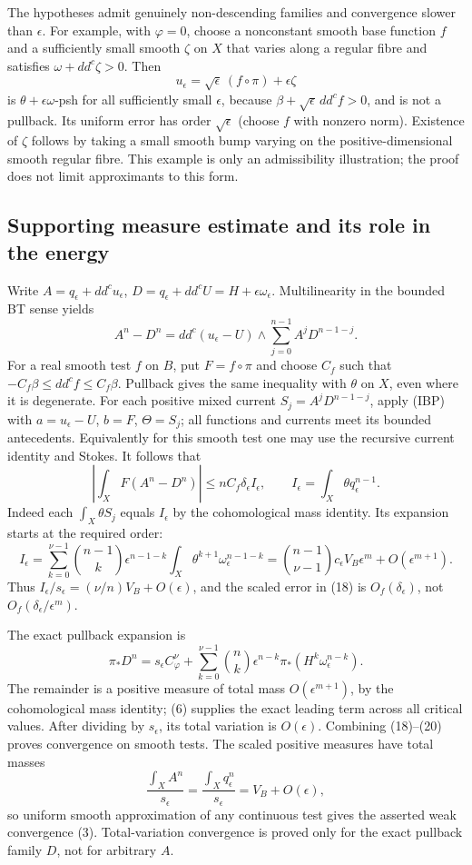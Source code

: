 \documentclass[
  11pt,
]{article}
\begin{document}
The hypotheses admit genuinely non-descending families and convergence
slower than \(\epsilon\). For example, with \(\varphi=0\), choose a
nonconstant smooth base function \(f\) and a sufficiently small smooth
\(\zeta\) on \(X\) that varies along a regular fibre and satisfies
\(\omega+dd^c\zeta>0\). Then
\[u_\epsilon=\sqrt\epsilon\,(f\circ\pi)+\epsilon\zeta\] is
\(\theta+\epsilon\omega\)-psh for all sufficiently small \(\epsilon\),
because \(\beta+\sqrt\epsilon\,dd^cf>0\), and is not a pullback. Its
uniform error has order \(\sqrt\epsilon\) (choose \(f\) with nonzero
norm). Existence of \(\zeta\) follows by taking a small smooth bump
varying on the positive-dimensional smooth regular fibre. This example
is only an admissibility illustration; the proof does not limit
approximants to this form.

\subsection{Supporting measure estimate and its role in the
energy}\label{supporting-measure-estimate-and-its-role-in-the-energy}

Write \(A=q_\epsilon+dd^cu_\epsilon\),
\(D=q_\epsilon+dd^cU=H+\epsilon\omega_\epsilon\). Multilinearity in the
bounded BT sense yields \[A^n-D^n=dd^c(u_\epsilon-U)\wedge
\sum_{j=0}^{n-1}A^jD^{n-1-j}. \tag{17}\] For a real smooth test \(f\) on
\(B\), put \(F=f\circ\pi\) and choose \(C_f\) such that
\(-C_f\beta\leq dd^cf\leq C_f\beta\). Pullback gives the same inequality
with \(\theta\) on \(X\), even where it is degenerate. For each positive
mixed current \(S_j=A^jD^{n-1-j}\), apply (IBP) with \(a=u_\epsilon-U\),
\(b=F\), \(\Theta=S_j\); all functions and currents meet its bounded
antecedents. Equivalently for this smooth test one may use the recursive
current identity and Stokes. It follows that
\[\left|\int_X F(A^n-D^n)\right|
\leq n C_f\delta_\epsilon I_\epsilon,\qquad
I_\epsilon=\int_X\theta q_\epsilon^{n-1}. \tag{18}\] Indeed each
\(\int_X\theta S_j\) equals \(I_\epsilon\) by the cohomological mass
identity. Its expansion starts at the required order:
\[I_\epsilon=\sum_{k=0}^{\nu-1}\binom{n-1}k\epsilon^{n-1-k}
\int_X\theta^{k+1}\omega_\epsilon^{n-1-k}
=\binom{n-1}{\nu-1}c_\epsilon V_B\epsilon^m
+O(\epsilon^{m+1}). \tag{19}\] Thus
\(I_\epsilon/s_\epsilon=(\nu/n)V_B+O(\epsilon)\), and the scaled error
in (18) is \(O_f(\delta_\epsilon)\), not
\(O_f(\delta_\epsilon/\epsilon^m)\).

The exact pullback expansion is \[\pi_*D^n=s_\epsilon C_\varphi^\nu+
\sum_{k=0}^{\nu-1}\binom nk\epsilon^{n-k}
\pi_*(H^k\omega_\epsilon^{n-k}). \tag{20}\] The remainder is a positive
measure of total mass \(O(\epsilon^{m+1})\), by the cohomological mass
identity; (6) supplies the exact leading term across all critical
values. After dividing by \(s_\epsilon\), its total variation is
\(O(\epsilon)\). Combining (18)--(20) proves convergence on smooth
tests. The scaled positive measures have total masses
\[\frac{\int_X A^n}{s_\epsilon}
=\frac{\int_Xq_\epsilon^n}{s_\epsilon}=V_B+O(\epsilon),\] so uniform
smooth approximation of any continuous test gives the asserted weak
convergence (3). Total-variation convergence is proved only for the
exact pullback family \(D\), not for arbitrary \(A\).
\end{document}
